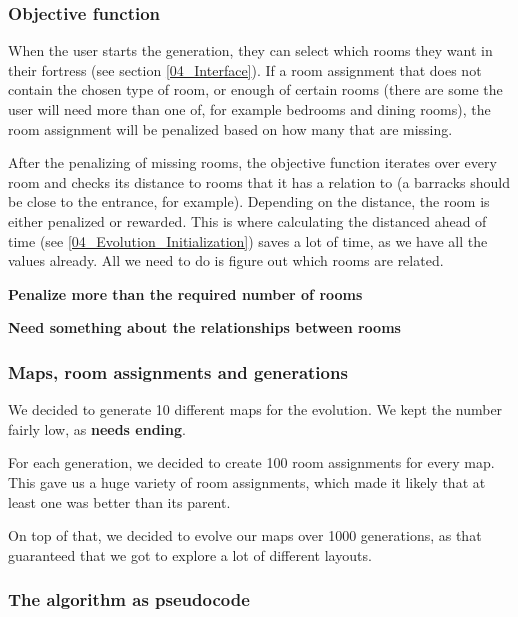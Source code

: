 \subsubsection{Objective function}

When the user starts the generation, they can select which rooms they want in their fortress (see section \ref{04_Interface}). If a room assignment that does not contain the chosen type of room, or enough of certain rooms (there are some the user will need more than one of, for example bedrooms and dining rooms), the room assignment will be penalized based on how many that are missing.

After the penalizing of missing rooms, the objective function iterates over every room and checks its distance to rooms that it has a relation to (a barracks should be close to the entrance, for example). Depending on the distance, the room is either penalized or rewarded. This is where calculating the distanced ahead of time (see \ref{04_Evolution_Initialization}) saves a lot of time, as we have all the values already. All we need to do is figure out which rooms are related.

\textbf{Penalize more than the required number of rooms}

\textbf{Need something about the relationships between rooms}

\subsubsection{Maps, room assignments and generations}

We decided to generate 10 different maps for the evolution. We kept the number fairly low, as \textbf{needs ending}.

For each generation, we decided to create 100 room assignments for every map. This gave us a huge variety of room assignments, which made it likely that at least one was better than its parent.

On top of that, we decided to evolve our maps over 1000 generations, as that guaranteed that we got to explore a lot of different layouts. 

\subsubsection{The algorithm as pseudocode}

